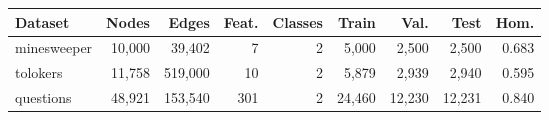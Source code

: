 \begin{tabular}{lrrrrrrrr}
\toprule
Dataset & Nodes & Edges & Feat. & Classes & Train & Val. & Test & Hom. \\
\midrule
minesweeper & 10,000 & 39,402 & 7 & 2 & 5,000 & 2,500 & 2,500 & 0.683 \\
tolokers & 11,758 & 519,000 & 10 & 2 & 5,879 & 2,939 & 2,940 & 0.595 \\
questions & 48,921 & 153,540 & 301 & 2 & 24,460 & 12,230 & 12,231 & 0.840 \\
\bottomrule
\end{tabular}
